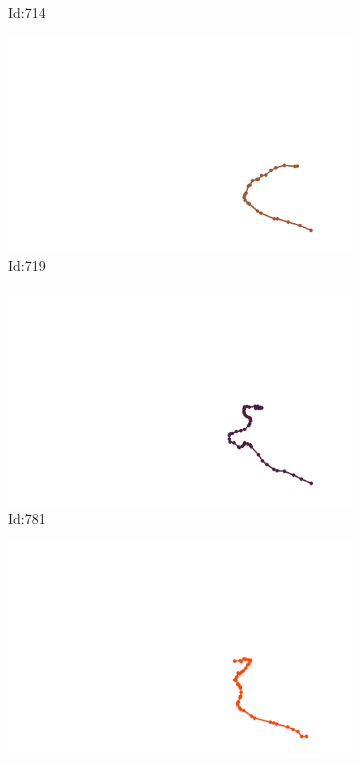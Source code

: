 \documentclass[12pt,twoside]{report}
\begin{document}
\begin{figure}
\begin{subfigure}[b]{0.20\textwidth}
\caption{Id:714}
\end{subfigure}
\begin{subfigure}[b]{0.20\textwidth}
\centering
\includegraphics[width=\textwidth]{../../trajectories/719.png}
\caption{Id:719}
\end{subfigure}
\begin{subfigure}[b]{0.20\textwidth}
\centering
\includegraphics[width=\textwidth]{../../trajectories/781.png}
\caption{Id:781}
\end{subfigure}
\begin{subfigure}[b]{0.20\textwidth}
\centering
\includegraphics[width=\textwidth]{../../trajectories/884.png}

\end{subfigure}
\end{figure}
\end{document}
